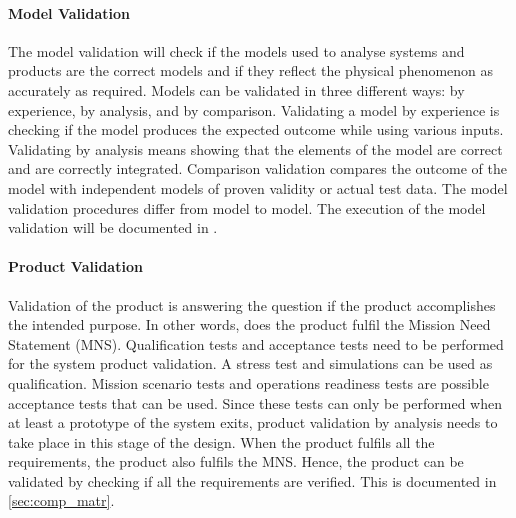 
\paragraph{Model Validation}
The model validation will check if the models used to analyse systems and products are the correct models and if they reflect the physical phenomenon as accurately as required. Models can be validated in three different ways: by experience, by analysis, and by comparison. Validating a model by experience is checking if the model produces the expected outcome while using various inputs. Validating by analysis means showing that the elements of the model are correct and are correctly integrated. Comparison validation compares the outcome of the model with independent models of proven validity or actual test data. The model validation procedures differ from model to model. The execution of the model validation will be documented in . 

\paragraph{Product Validation}
Validation of the product is answering the question if the product accomplishes the intended purpose. In other words, does the product fulfil the Mission Need Statement (MNS). Qualification tests and acceptance tests need to be performed for the system product validation. A stress test and simulations can be used as qualification. Mission scenario tests and operations readiness tests are possible acceptance tests that can be used. Since these tests can only be performed when at least a prototype of the system exits, product validation by analysis needs to take place in this stage of the design. When the product fulfils all the requirements, the product also fulfils the MNS. Hence, the product can be validated by checking if all the requirements are verified. This is documented in \autoref{sec:comp_matr}.


\begin{comment}
\section{Sustainable Development Strategy}
\label{sec:sust_deve_stra}

Life Cycle Assessment (LCA) is chosen to analyse sustainability of the design. Sustainable development and LCA will be elaborated on in \autoref{ch:susdevlca}.


\end{comment}






